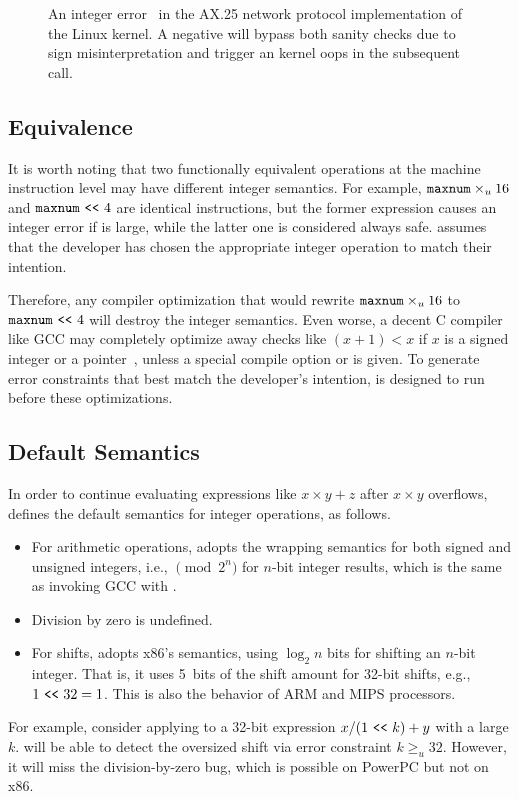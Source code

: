 \begin{figure}
\centering

\vspace{-1em}
\caption{An integer error~\cite[CVE-2009-2909]{cve} in the AX.25
network protocol implementation of the Linux kernel.  A negative
 will bypass both sanity checks due to sign misinterpretation
 and trigger an kernel
oops in the subsequent  call.}
\label{f:ax25-sign}
\end{figure}

\subsection{Equivalence}

It is worth noting that two functionally equivalent operations at
the machine instruction level may have different integer semantics.
For example, $\texttt{maxnum}\times_u 16$ and $\texttt{maxnum} \ \texttt{<}\texttt{<}\  4$ are
identical instructions, but the former expression causes an integer
error if  is large, while the latter one is considered
always safe.  \sys assumes that the developer has chosen the
appropriate integer operation to match their intention.

Therefore, any compiler optimization that would rewrite
$\texttt{maxnum}\times_u 16$ to $\texttt{maxnum} \ \texttt{<}\texttt{<}\  4$ will destroy the
integer semantics.  Even worse, a decent C compiler like GCC may completely
optimize away checks like $(x + 1) < x$ if $x$ is a signed integer
or a pointer~\cite{gcc:signed-overflow,us-cert:gcc}, unless a special
compile option  or  is given.
To generate error constraints that best match the developer's
intention, \sys is designed to run before these optimizations.

\subsection{Default Semantics}

In order to continue evaluating expressions like $x \times y + z$
after $x \times y$ overflows,
\sys defines the default semantics for integer operations,
as follows.
\begin{itemize}
\item
For arithmetic operations, \sys adopts the wrapping semantics for
both signed and unsigned integers, i.e., $\pmod{2^n}$ for $n$-bit
integer results, which is the same as invoking GCC with .
\item
Division by zero is undefined.
\item
For shifts, \sys adopts x86's semantics, using $\log_2 n$ bits for
shifting an $n$-bit integer.  That is, it uses 5~bits of the shift
amount for 32-bit shifts, e.g., $1 \ \texttt{<}\texttt{<}\  32 = 1$.  This is also the
behavior of ARM and MIPS processors.
\end{itemize}
For example, consider applying  \sys to a 32-bit expression $x /
(1 \ \texttt{<}\texttt{<}\  k) + y$ with a large $k$.  \sys will be able to detect the
oversized shift via error constraint $k \geq_u 32$.  However, it
will miss the division-by-zero bug, which is possible on PowerPC
but not on x86.

